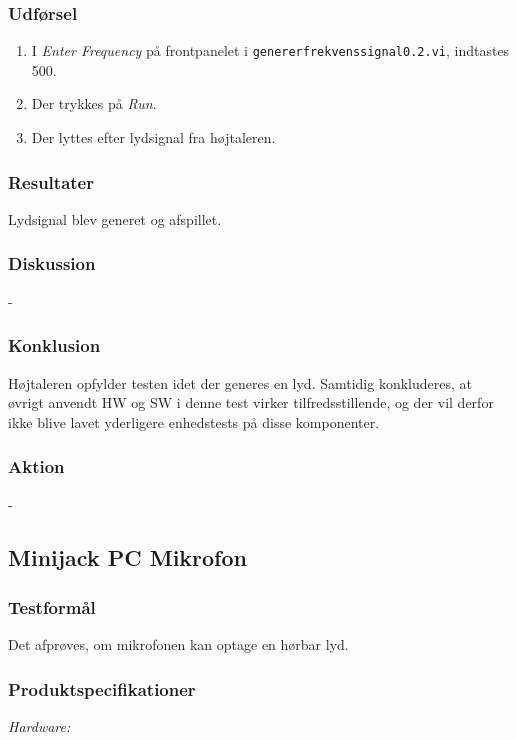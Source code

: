 		\subsubsection{Udførsel}
			\begin{enumerate}
				\item I \textit{Enter Frequency} på frontpanelet i \texttt{genererfrekvenssignal0.2.vi}, indtastes 500. 
				\item Der trykkes på \textit{Run}. 
				\item Der lyttes efter lydsignal fra højtaleren.  
			\end{enumerate}
			
		\subsubsection{Resultater}
		Lydsignal blev generet og afspillet. 
		\subsubsection{Diskussion} 
		-
		\subsubsection{Konklusion}
		Højtaleren opfylder testen idet der generes en lyd. Samtidig konkluderes, at øvrigt anvendt HW og SW i denne test virker tilfredsstillende, og der vil derfor ikke blive lavet yderligere enhedstests på disse komponenter. 
	
		\subsubsection{Aktion}
		- 
	\subsection{Minijack PC Mikrofon}
		\subsubsection{Testformål}
		Det afprøves, om mikrofonen kan optage en hørbar lyd. 
		\subsubsection{Produktspecifikationer}
	
			\textit{Hardware:}\\
			\mikrofon\\
			\PC\\
	
